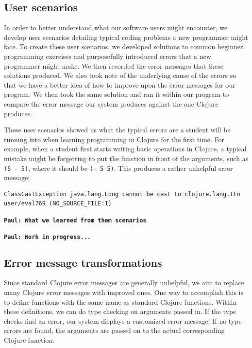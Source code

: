 \documentclass[12pt]{article}
\newcommand{\comment}[1]{{\bf \tt  {#1}}}
\newcommand{\pscomment}[1]{\textcolor{Coquelicot}{\comment{Paul: {#1}}}}
\begin{document}
\subsection{User scenarios}\label{sec:scenarios}

In order to better understand what our software users might encounter, we develop user scenarios detailing typical coding problems a new programmer might face.
To create these user scenarios, we developed solutions to common beginner programming exercises and purposefully introduced errors that a new programmer might make.
We then recorded the error messages that these solutions produced.
We also took note of the underlying cause of the errors so that we have a better idea of how to improve upon the error messages for our program.
We then took the same solution and ran it within our program to compare the error message our system produces against the one Clojure produces.  

These user scenarios showed us what the typical errors are a student will be running into when learning programming in Clojure for the first time.
For example, when a student first starts writing basic operations in Clojure, a typical mistake might be forgetting to put the function in front of the arguments,
such as \texttt{(5 - 5)}, where it should be \texttt{(- 5 5)}. 
This produces a rather unhelpful error message: 

\begin{verbatim}
ClassCastException java.lang.Long cannot be cast to clojure.lang.IFn
user/eval769 (NO_SOURCE_FILE:1)
\end{verbatim}

\pscomment{What we learned from them scenarios}

\pscomment{Work in progress...}

\subsection{Error message transformations}\label{sec:transform}

Since standard Clojure error messages are generally unhelpful, we aim to replace many Clojure error messages with improved ones.
One way to accomplish this is to define functions with the same name as standard Clojure functions.
Within these definitions, we can do type checking on arguments passed in.
If the type checks find an error, our system displays a customized error message.
If no type errors are found, the arguments are passed on to the actual corresponding Clojure function.
\end{document}
